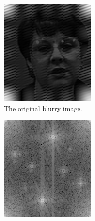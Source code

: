 \begin{figure}
\captionsetup[subfigure]{justification=centering}
\centering
\begin{subfigure}{.4\textwidth}
    \centering
    \includegraphics[width=\linewidth]{figures/blurry_face.png}
    \caption{The original blurry image.}
    \label{fig:blurry_face}
\end{subfigure}
\begin{subfigure}{.4\textwidth}
    \centering
    \includegraphics[width=\linewidth]{figures/blurry_fft.png}

\end{subfigure}
\end{figure}
